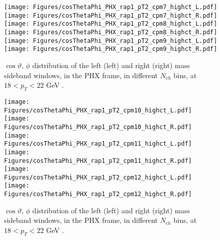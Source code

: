 \documentclass[12pt]{article}
\begin{document}
\begin{figure}[htbp]
\centering
\texttt{[image: Figures/cosThetaPhi\_PHX\_rap1\_pT2\_cpm7\_highct\_L.pdf]}
\texttt{[image: Figures/cosThetaPhi\_PHX\_rap1\_pT2\_cpm7\_highct\_R.pdf]}
\texttt{[image: Figures/cosThetaPhi\_PHX\_rap1\_pT2\_cpm8\_highct\_L.pdf]}
\texttt{[image: Figures/cosThetaPhi\_PHX\_rap1\_pT2\_cpm8\_highct\_R.pdf]}
\texttt{[image: Figures/cosThetaPhi\_PHX\_rap1\_pT2\_cpm9\_highct\_L.pdf]}
\texttt{[image: Figures/cosThetaPhi\_PHX\_rap1\_pT2\_cpm9\_highct\_R.pdf]}
\caption{$\cos\vartheta,\,\phi$ distribution of the left (left) and
  right (right) mass sideband windows, in the PHX frame, in different
  $N_{ch}$ bins, at $18 < p_{T} < 22$ GeV .}
\end{figure}
\clearpage

\begin{figure}[htbp]
\centering
\texttt{[image: Figures/cosThetaPhi\_PHX\_rap1\_pT2\_cpm10\_highct\_L.pdf]}
\texttt{[image: Figures/cosThetaPhi\_PHX\_rap1\_pT2\_cpm10\_highct\_R.pdf]}
\texttt{[image: Figures/cosThetaPhi\_PHX\_rap1\_pT2\_cpm11\_highct\_L.pdf]}
\texttt{[image: Figures/cosThetaPhi\_PHX\_rap1\_pT2\_cpm11\_highct\_R.pdf]}
\texttt{[image: Figures/cosThetaPhi\_PHX\_rap1\_pT2\_cpm12\_highct\_L.pdf]}
\texttt{[image: Figures/cosThetaPhi\_PHX\_rap1\_pT2\_cpm12\_highct\_R.pdf]}
\caption{$\cos\vartheta,\,\phi$ distribution of the left (left) and
  right (right) mass sideband windows, in the PHX frame, in different
  $N_{ch}$ bins, at $18 < p_{T} < 22$ GeV .}
\end{figure}
\clearpage
\end{document}

